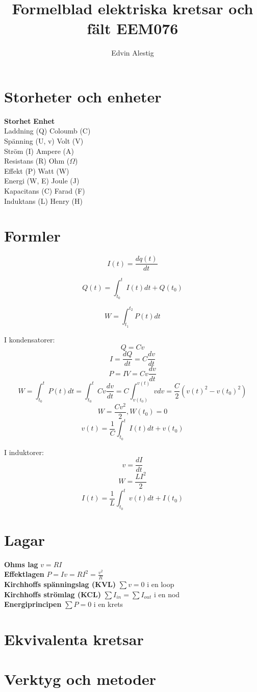 \documentclass{article}
\title{Formelblad elektriska kretsar och fält EEM076}
\author{Edvin Alestig}
\begin{document}
\maketitle

\section{Storheter och enheter}

\textbf{Storhet} \tab \textbf{Enhet}
\\
Laddning (Q)  \tab Coloumb (C)
\\
Spänning (U, v) \tab Volt (V)
\\
Ström (I) \tab Ampere (A)
\\
Resistans (R) \tab Ohm ($\Omega$)
\\
Effekt (P) \tab Watt (W)
\\
Energi (W, E) \tab Joule (J)
\\
Kapacitans (C) \tab Farad (F)
\\
Induktans (L) \tab Henry (H)

\section{Formler}

\[ I(t) = \frac{dq(t)}{dt} \]

\[ Q(t) = \int_{t_0}^t I(t)dt + Q(t_0) \]

\[ W = \int_{t_1}^{t_2} P(t)dt \]

I kondensatorer:
\[ Q = Cv \]
\[ I = \frac{dQ}{dt} = C \frac{dv}{dt} \]
\[ P = IV = Cv \frac{dv}{dt} \]
\[ W = \int_{t_0}^t P(t)dt = \int_{t_0}^t Cv \frac{dv}{dt} = C \int_{v(t_0)}^{v(t)} vdv = \frac{C}{2}(v(t)^2 - v(t_0)^2) \]
\[ W = \frac{Cv^2}{2}, W(t_0) = 0 \]
\[ v(t) = \frac{1}{C} \int_{t_0}^t I(t)dt + v(t_0) \]

I induktorer:
\[ v = \frac{dI}{dt} \]
\[ W = \frac{LI^2}{2} \]
\[ I(t) = \frac{1}{L} \int_{t_0}^t v(t)dt + I(t_0) \]

\section{Lagar}

\textbf{Ohms lag} \tab  $ v=RI $
\\
\textbf{Effektlagen} \tab  $ P = Iv = RI^2 = \frac{v^2}{R} $
\\
\textbf{Kirchhoffs spänningslag (KVL)} \tab $ \sum v = 0 $  i en loop
\\
\textbf{Kirchhoffs strömlag (KCL)} \tab $ \sum I_{in} = \sum I_{out} $  i en nod
\\
\textbf{Energiprincipen} \tab $ \sum P = 0 $ i en krets

\section{Ekvivalenta kretsar}


\section{Verktyg och metoder}

\end{document}
